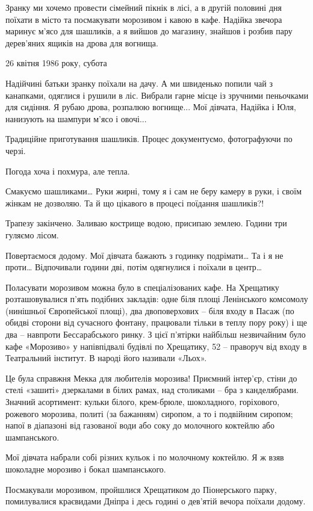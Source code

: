 Зранку ми хочемо провести сімейний пікнік в лісі, а в другій половині дня
поїхати в місто та посмакувати морозивом і кавою в кафе. Надійка звечора
маринує м’ясо для шашликів, а я вийшов до магазину, знайшов і розбив пару
дерев’яних ящиків на дрова для вогнища. 

26 квітня 1986 року, субота 

Надійчині батьки зранку поїхали на дачу. А ми швиденько попили чай з канапками,
одяглися і рушили в ліс. Вибрали гарне місце із зручними пеньочками для
сидіння. Я рубаю дрова, розпалюю вогнище... Мої дівчата, Надійка і Юля, нанизують
на шампури м’ясо і овочі...

Традиційне приготування шашликів. Процес документуємо, фотографуючи по черзі.

Погода хоча і похмура, але тепла. 

Смакуємо шашликами… Руки жирні, тому я і сам не беру камеру в руки, і своїм
жінкам не дозволяю. Та й що цікавого в процесі поїдання шашликів?!

Трапезу закінчено. Заливаю кострище водою, присипаю землею. Години три гуляємо
лісом.

Повертаємося додому. Мої дівчата бажають з годинку подрімати… Та і я не проти…
Відпочивали години дві, потім одягнулися і поїхали в центр… 

Поласувати морозивом можна було в спеціалізованих кафе. На Хрещатику
розташовувалися п'ять подібних закладів: одне біля площі Ленінського комсомолу
(нинішньої Європейської площі), два двоповерхових – біля входу в Пасаж (по
обидві сторони від сучасного фонтану, працювали тільки в теплу пору року) і ще
два – навпроти Бессарабського ринку. З цієї п'ятірки найбільш незвичайним було
кафе «Морозиво» у напівпідвалі будівлі по Хрещатику, 52 – праворуч від входу в
Театральний інститут. В народі його називали «Льох».

Це була справжня Мекка для любителів морозива! Приємний інтер'єр, стіни до
стелі «зашиті» дзеркалами в білих рамах, над столиками – бра з канделябрами.
Значний асортимент: кульки білого, крем-брюле, шоколадного, горіхового,
рожевого морозива, политі (за бажанням) сиропом, а то і подвійним сиропом;
напої в діапазоні від газованої води або соку до молочного коктейлю або
шампанського. 

Мої дівчата набрали собі різних кульок і по молочному коктейлю. Я ж взяв
шоколадне морозиво і бокал шампанського. 

Посмакували морозивом, пройшлися Хрещатиком до Піонерського парку, помилувалися
краєвидами Дніпра і десь годині о дев’ятій вечора поїхали додому.

